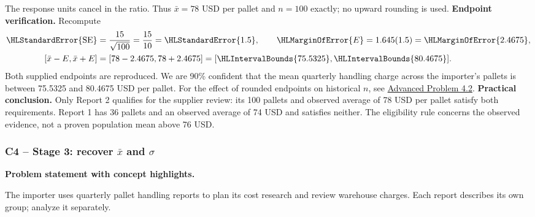 The response units cancel in the ratio. Thus $\bar x=78$ USD per pallet and $n=100$ exactly; no upward rounding is used.
\textbf{Endpoint verification.} Recompute
\[\begin{aligned}
\HLStandardError{\mathrm{SE}}&=\frac{15}{\sqrt{100}}=\frac{15}{10}=\HLStandardError{1.5},\qquad \HLMarginOfError{E}=1.645(1.5)=\HLMarginOfError{2.4675},\\
[\bar x-E,\bar x+E]&=[78-2.4675,78+2.4675]=[\HLIntervalBounds{75.5325},\HLIntervalBounds{80.4675}].
\end{aligned}\]
Both supplied endpoints are reproduced. We are 90\% confident that the mean quarterly handling charge across the importer's pallets is between 75.5325 and 80.4675 USD per pallet.
For the effect of rounded endpoints on historical $n$, see \hyperref[prob:c4-advanced-2]{Advanced Problem 4.2}.
\textbf{Practical conclusion.} Only Report 2 qualifies for the supplier review: its 100 pallets and observed average of 78 USD per pallet satisfy both requirements. Report 1 has 36 pallets and an observed average of 74 USD and satisfies neither. The eligibility rule concerns the observed evidence, not a proven population mean above 76 USD.
\clearpage
\subsubsection*{C4 -- Stage 3: recover $\bar x$ and $\sigma$}\label{sol:c4-2-c}
\textbf{Problem statement with concept highlights.}
\begingroup\raggedright
The importer uses quarterly pallet handling reports to plan its cost research and review warehouse charges. Each report describes its own group; analyze it separately.

